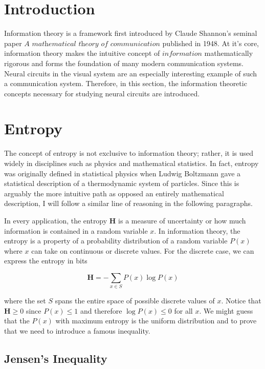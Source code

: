 \documentclass[a4paper,11pt]{book}
\begin{document}
\section{Introduction}

Information theory is a framework first introduced by Claude Shannon's seminal paper $\textit{A mathematical theory of communication}$  published in 1948. At it's core, information theory makes the intuitive concept of $\textit{information}$ mathematically rigorous and forms the foundation of many modern communication systems. Neural circuits in the visual system are an especially interesting example of such a communication system. Therefore, in this section, the information theoretic concepts necessary for studying neural circuits are introduced. 

\section{Entropy}

The concept of entropy is not exclusive to information theory; rather, it is used widely in disciplines such as physics and mathematical statistics. In fact, entropy was originally defined in statistical physics when Ludwig Boltzmann gave a statistical description of a thermodynamic system of particles. Since this is arguably the more intuitive path as opposed an entirely mathematical description, I will follow a similar line of reasoning in the following paragraphs.

In every application, the entropy $\mathbf{H}$ is a measure of uncertainty or how much information is contained in a random variable $x$. In information theory, the entropy is a property of a probability distribution of a random variable $P(x)$ where $x$ can take on continuous or discrete values. For the discrete case, we can express the entropy in bits 

\begin{equation}
\textbf{H} = -\sum_{x\in S} P(x)\log P(x)
\end{equation}

where the set $S$ spans the entire space of possible discrete values of $x$. Notice that $\mathbf{H} \geq 0$ since $P(x) \leq 1$ and therefore $\log P(x) \leq 0$  for all $x$. We might guess that the $P(x)$ with maximum entropy is the uniform distribution and to prove that we need to introduce a famous inequality.

\subsection{Jensen's Inequality}
\end{document}
